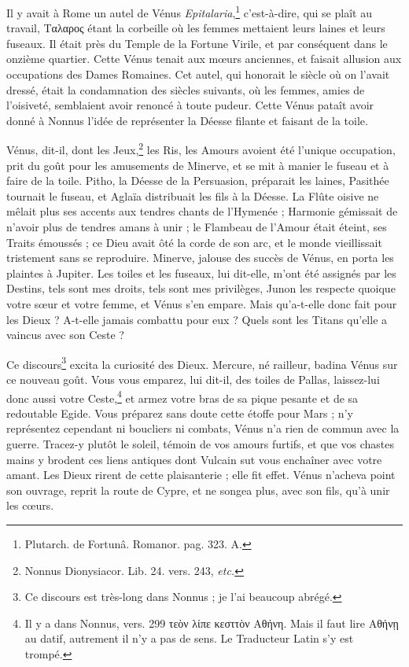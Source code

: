 \documentclass[a4paper, 11pt, oneside, polutonikogreek, french]{article}
\begin{document}
Il y avait à Rome un autel de Vénus \emph{Epitalaria},\footnote{Plutarch. de Fortunâ. Romanor. pag. 323. A.} c'est-à-dire, qui se plaît au travail, Ταλαρος étant la corbeille où les femmes mettaient leurs laines et leurs fuseaux. Il était près du Temple de la Fortune Virile, et par conséquent dans le onzième quartier. Cette Vénus tenait aux mœurs anciennes, et faisait allusion aux occupations des Dames Romaines. Cet autel, qui honorait le siècle où on l'avait dressé, était la condamnation des siècles suivants, où les femmes, amies de l'oisiveté, semblaient avoir renoncé à toute pudeur. Cette Vénus pataît avoir donné à Nonnus l'idée de représenter la Déesse filante et faisant de la toile.

Vénus, dit-il, dont les Jeux,\footnote{Nonnus Dionysiacor. Lib. 24. vers. 243, \emph{etc.}} les Ris, les Amours avoient été l'unique occupation, prit du goût pour les amusements de Minerve, et se mit à manier le fuseau et à faire de la toile. Pitho, la Déesse de la Persuasion, préparait les laines, Pasithée tournait le fuseau, et Aglaïa distribuait les fils à la Déesse. La Flûte oisive ne mêlait plus ses accents aux tendres chants de l'Hymenée ; Harmonie gémissait de n'avoir plus de tendres amans à unir ; le Flambeau de l'Amour était éteint, ses Traits émoussés ; ce Dieu avait ôté la corde de son arc, et le monde vieillissait tristement sans se reproduire. Minerve, jalouse des succès de Vénus, en porta les plaintes à Jupiter. Les toiles et les fuseaux, lui dit-elle, m'ont été assignés par les Destins, tels sont mes droits, tels sont mes privilèges, Junon les respecte quoique votre sœur et votre femme, et Vénus s'en empare. Mais qu'a-t-elle donc fait pour les Dieux ? A-t-elle jamais combattu pour eux ? Quels sont les Titans qu'elle a vaincus avec son Ceste ?

Ce discours\footnote{Ce discours est très-long dans Nonnus ; je l'ai beaucoup abrégé.} excita la curiosité des Dieux. Mercure, né railleur, badina Vénus sur ce nouveau goût. Vous vous emparez, lui dit-il, des toiles de Pallas, laissez-lui donc aussi votre Ceste,\footnote{Il y a dans Nonnus, vers. 299 τεὸν λίπε κεσττὸν Αθήνη. Mais il faut lire Αθήνῃ au datif, autrement il n'y a pas de sens. Le Traducteur Latin s'y est trompé.} et armez votre bras de sa pique pesante et de sa redoutable Egide. Vous préparez sans doute cette étoffe pour Mars ; n'y représentez cependant ni boucliers ni combats, Vénus n'a rien de commun avec la guerre. Tracez-y plutôt le soleil, témoin de vos amours furtifs, et que vos chastes mains y brodent ces liens antiques dont Vulcain sut vous enchaîner avec votre amant. Les Dieux rirent de cette plaisanterie ; elle fit effet. Vénus n'acheva point son ouvrage, reprit la route de Cypre, et ne songea plus, avec son fils, qu'à unir les cœurs.
\end{document}
